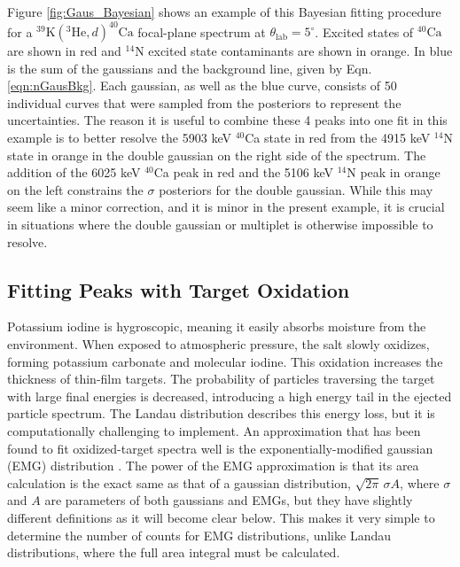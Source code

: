 Figure \ref{fig:Gaus_Bayesian} shows an example of this Bayesian fitting procedure for a $^{39}\mathrm{K}(^{3}\mathrm{He},d)^{40}\mathrm{Ca}$ focal-plane spectrum at $\theta_{\mathrm{lab}} = 5^{\circ}$. Excited states of $^{40}\mathrm{Ca}$ are shown in red and $^{14}\mathrm{N}$ excited state contaminants are shown in orange. In blue is the sum of the gaussians and the background line, given by Eqn. \ref{eqn:nGausBkg}. Each gaussian, as well as the blue curve, consists of 50 individual curves that were sampled from the posteriors to represent the uncertainties. The reason it is useful to combine these 4 peaks into one fit in this example is to better resolve the 5903 keV $^{40}$Ca state in red from the 4915 keV $^{14}$N state in orange in the double gaussian on the right side of the spectrum. The addition of the 6025 keV $^{40}$Ca peak in red and the 5106 keV $^{14}$N peak in orange on the left constrains the $\sigma$ posteriors for the double gaussian. While this may seem like a minor correction, and it is minor in the present example, it is crucial in situations where the double gaussian or multiplet is otherwise impossible to resolve.

\subsection{Fitting Peaks with Target Oxidation} \label{subsec:oxidation}

Potassium iodine is hygroscopic, meaning it easily absorbs moisture from the environment. When exposed to atmospheric pressure, the salt slowly oxidizes, forming potassium carbonate and molecular iodine. This oxidation increases the thickness of thin-film targets. The probability of particles traversing the target with large final energies is decreased, introducing a high energy tail in the ejected particle spectrum. The Landau distribution describes this energy loss, but it is computationally challenging to implement. An approximation that has been found to fit oxidized-target spectra well is the exponentially-modified gaussian (EMG) distribution \cite{Babu2016}. The power of the EMG approximation is that its area calculation is the exact same as that of a gaussian distribution, $\sqrt{2\pi} \, \sigma A$, where $\sigma$ and $A$ are parameters of both gaussians and EMGs, but they have slightly different definitions as it will become clear below. This makes it very simple to determine the number of counts for EMG distributions, unlike Landau distributions, where the full area integral must be calculated.

